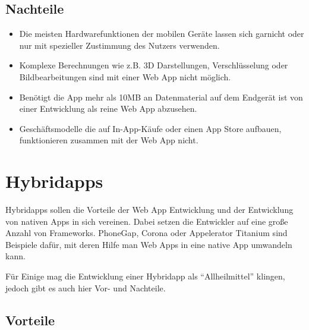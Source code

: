 \subsection{Nachteile}
\label{sec:webapp:cons}

\begin{itemize}

	\item Die meisten Hardwarefunktionen der mobilen Geräte lassen sich garnicht oder nur mit spezieller Zustimmung des Nutzers verwenden.\cite[]{WEB:APPEV:2014}

	\item Komplexe Berechnungen wie z.B. 3D Darstellungen, Verschlüsselung oder Bildbearbeitungen sind mit einer Web App nicht möglich.\cite[]{WEB:APPEV:2014}

	\item Benötigt die App mehr als 10MB an Datenmaterial auf dem Endgerät ist von einer Entwicklung als reine Web App abzusehen.\cite[]{WEB:APPEV:2014}

	\item Geschäftsmodelle die auf In-App-Käufe oder einen App Store aufbauen, funktionieren zusammen mit der Web App nicht.\cite[]{WEB:APPEV:2014}

\end{itemize}

\section{Hybridapps}
\label{sec:intro:hybrid}

Hybridapps sollen die Vorteile der Web App Entwicklung und der Entwicklung von nativen Apps in sich vereinen. Dabei setzen die Entwickler auf eine große Anzahl von Frameworks. PhoneGap, Corona oder Appelerator Titanium sind Beispiele dafür, mit deren Hilfe man Web Apps in eine native App umwandeln kann.

Für Einige mag die Entwicklung einer Hybridapp als ``Allheilmittel'' klingen, jedoch gibt es auch hier Vor- und Nachteile.\cite[]{WEB:APPEV:2014}

\subsection{Vorteile}
\label{sec:hybrid:pros}

